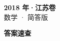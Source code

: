 \documentclass[zihao=-4, a4paper]{ctexart}
\begin{document}
\begin{center}
  {\Large\bfseries 2018 年·江苏卷}\\[4pt]
  {\large 数学 · 简答版}
\end{center}
\medskip
{}

\clearpage
{}
\begin{center}{\Large\bfseries 答案速查}\end{center}
\medskip

\end{document}
